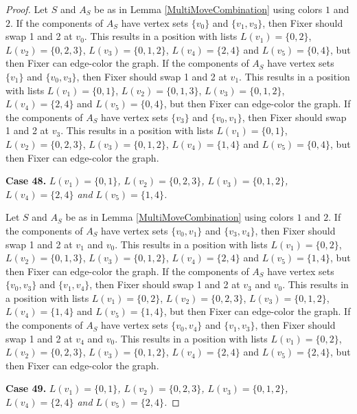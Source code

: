 \documentclass[12pt]{amsart}
\theoremstyle{plain}
\theoremstyle{definition}
\theoremstyle{remark}
\begin{document}
\begin{proof}
Let $S$ and $A_S$ be as in Lemma \ref{MultiMoveCombination} using colors $1$ and $2$. If the components of $A_S$ have vertex sets $\{v_0\}$ and $\{v_1, v_3\}$, then Fixer should swap 1 and 2 at $v_0$. This results in a position with lists $L(v_1) = \{0, 2\}$, $L(v_2) = \{0, 2, 3\}$, $L(v_3) = \{0, 1, 2\}$, $L(v_4) = \{2, 4\}$ and $L(v_5) = \{0, 4\}$, but then Fixer can edge-color the graph.
If the components of $A_S$ have vertex sets $\{v_1\}$ and $\{v_0, v_3\}$, then Fixer should swap 1 and 2 at $v_1$. This results in a position with lists $L(v_1) = \{0, 1\}$, $L(v_2) = \{0, 1, 3\}$, $L(v_3) = \{0, 1, 2\}$, $L(v_4) = \{2, 4\}$ and $L(v_5) = \{0, 4\}$, but then Fixer can edge-color the graph.
If the components of $A_S$ have vertex sets $\{v_3\}$ and $\{v_0, v_1\}$, then Fixer should swap 1 and 2 at $v_3$. This results in a position with lists $L(v_1) = \{0, 1\}$, $L(v_2) = \{0, 2, 3\}$, $L(v_3) = \{0, 1, 2\}$, $L(v_4) = \{1, 4\}$ and $L(v_5) = \{0, 4\}$, but then Fixer can edge-color the graph.

\noindent\textbf{Case 48.  }\textit{$L(v_1) = \{0, 1\}$, $L(v_2) = \{0, 2, 3\}$, $L(v_3) = \{0, 1, 2\}$, $L(v_4) = \{2, 4\}$ and $L(v_5) = \{1, 4\}$.}

Let $S$ and $A_S$ be as in Lemma \ref{MultiMoveCombination} using colors $1$ and $2$. If the components of $A_S$ have vertex sets $\{v_0, v_1\}$ and $\{v_3, v_4\}$, then Fixer should swap 1 and 2 at $v_1$ and $v_0$. This results in a position with lists $L(v_1) = \{0, 2\}$, $L(v_2) = \{0, 1, 3\}$, $L(v_3) = \{0, 1, 2\}$, $L(v_4) = \{2, 4\}$ and $L(v_5) = \{1, 4\}$, but then Fixer can edge-color the graph.
If the components of $A_S$ have vertex sets $\{v_0, v_3\}$ and $\{v_1, v_4\}$, then Fixer should swap 1 and 2 at $v_3$ and $v_0$. This results in a position with lists $L(v_1) = \{0, 2\}$, $L(v_2) = \{0, 2, 3\}$, $L(v_3) = \{0, 1, 2\}$, $L(v_4) = \{1, 4\}$ and $L(v_5) = \{1, 4\}$, but then Fixer can edge-color the graph.
If the components of $A_S$ have vertex sets $\{v_0, v_4\}$ and $\{v_1, v_3\}$, then Fixer should swap 1 and 2 at $v_4$ and $v_0$. This results in a position with lists $L(v_1) = \{0, 2\}$, $L(v_2) = \{0, 2, 3\}$, $L(v_3) = \{0, 1, 2\}$, $L(v_4) = \{2, 4\}$ and $L(v_5) = \{2, 4\}$, but then Fixer can edge-color the graph.

\noindent\textbf{Case 49.  }\textit{$L(v_1) = \{0, 1\}$, $L(v_2) = \{0, 2, 3\}$, $L(v_3) = \{0, 1, 2\}$, $L(v_4) = \{2, 4\}$ and $L(v_5) = \{2, 4\}$.}


\end{proof}
\end{document}
